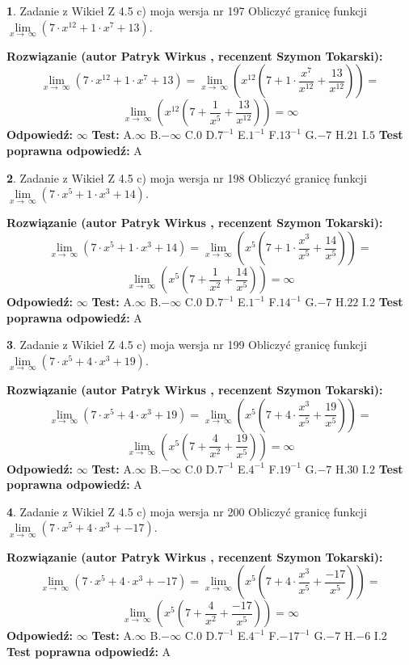 \documentclass[12pt, a4paper]{article}
\theoremstyle{definition} %
\newtheorem{zad}{}
\newcommand{\zadStart}[1]{\begin{zad}#1\newline}
\newcommand{\zadStop}{\end{zad}}
\newcommand{\rozwStart}[2]{\noindent \textbf{Rozwiązanie (autor #1 , recenzent #2): }\newline}
\newcommand{\rozwStop}{\newline}
\newcommand{\odpStart}{\noindent \textbf{Odpowiedź:}\newline}
\newcommand{\odpStop}{\newline}
\newcommand{\testStart}{\noindent \textbf{Test:}\newline}
\newcommand{\testStop}{\newline}
\newcommand{\kluczStart}{\noindent \textbf{Test poprawna odpowiedź:}\newline}
\newcommand{\kluczStop}{\newline}
\begin{document}
\zadStart{Zadanie z Wikieł Z 4.5 c) moja wersja nr 197}
Obliczyć granicę funkcji  $\lim\limits_{x\to\ \infty}(7 \cdot x^{12}+1 \cdot x^{7}+13)$.
\zadStop
\rozwStart{Patryk Wirkus}{Szymon Tokarski}
$$\lim\limits_{x\to\ \infty}(7 \cdot x^{12}+1 \cdot x^{7}+13) = \lim\limits_{x\to\ \infty}(x^{12}(7 +1 \cdot \frac{x^{7}}{x^{12}}+\frac{13}{x^{12}})) =$$ $$\lim\limits_{x\to\ \infty}(x^{12}(7 +\frac{1}{x^{5}}+\frac{13}{x^{12}})) =\infty$$
\rozwStop
\odpStart
$\infty$
\odpStop
\testStart
A.$\infty$ B.$-\infty$ C.$0$ D.$7^{-1}$ E.$1^{-1}$
F.$13^{-1}$ G.$-7$
H.$21$
I.$5$
\testStop
\kluczStart
A
\kluczStop



\zadStart{Zadanie z Wikieł Z 4.5 c) moja wersja nr 198}
Obliczyć granicę funkcji  $\lim\limits_{x\to\ \infty}(7 \cdot x^{5}+1 \cdot x^{3}+14)$.
\zadStop
\rozwStart{Patryk Wirkus}{Szymon Tokarski}
$$\lim\limits_{x\to\ \infty}(7 \cdot x^{5}+1 \cdot x^{3}+14) = \lim\limits_{x\to\ \infty}(x^{5}(7 +1 \cdot \frac{x^{3}}{x^{5}}+\frac{14}{x^{5}})) =$$ $$\lim\limits_{x\to\ \infty}(x^{5}(7 +\frac{1}{x^{2}}+\frac{14}{x^{5}})) =\infty$$
\rozwStop
\odpStart
$\infty$
\odpStop
\testStart
A.$\infty$ B.$-\infty$ C.$0$ D.$7^{-1}$ E.$1^{-1}$
F.$14^{-1}$ G.$-7$
H.$22$
I.$2$
\testStop
\kluczStart
A
\kluczStop



\zadStart{Zadanie z Wikieł Z 4.5 c) moja wersja nr 199}
Obliczyć granicę funkcji  $\lim\limits_{x\to\ \infty}(7 \cdot x^{5}+4 \cdot x^{3}+19)$.
\zadStop
\rozwStart{Patryk Wirkus}{Szymon Tokarski}
$$\lim\limits_{x\to\ \infty}(7 \cdot x^{5}+4 \cdot x^{3}+19) = \lim\limits_{x\to\ \infty}(x^{5}(7 +4 \cdot \frac{x^{3}}{x^{5}}+\frac{19}{x^{5}})) =$$ $$\lim\limits_{x\to\ \infty}(x^{5}(7 +\frac{4}{x^{2}}+\frac{19}{x^{5}})) =\infty$$
\rozwStop
\odpStart
$\infty$
\odpStop
\testStart
A.$\infty$ B.$-\infty$ C.$0$ D.$7^{-1}$ E.$4^{-1}$
F.$19^{-1}$ G.$-7$
H.$30$
I.$2$
\testStop
\kluczStart
A
\kluczStop



\zadStart{Zadanie z Wikieł Z 4.5 c) moja wersja nr 200}
Obliczyć granicę funkcji  $\lim\limits_{x\to\ \infty}(7 \cdot x^{5}+4 \cdot x^{3}+-17)$.
\zadStop
\rozwStart{Patryk Wirkus}{Szymon Tokarski}
$$\lim\limits_{x\to\ \infty}(7 \cdot x^{5}+4 \cdot x^{3}+-17) = \lim\limits_{x\to\ \infty}(x^{5}(7 +4 \cdot \frac{x^{3}}{x^{5}}+\frac{-17}{x^{5}})) =$$ $$\lim\limits_{x\to\ \infty}(x^{5}(7 +\frac{4}{x^{2}}+\frac{-17}{x^{5}})) =\infty$$
\rozwStop
\odpStart
$\infty$
\odpStop
\testStart
A.$\infty$ B.$-\infty$ C.$0$ D.$7^{-1}$ E.$4^{-1}$
F.$-17^{-1}$ G.$-7$
H.$-6$
I.$2$
\testStop
\kluczStart
A
\kluczStop
\end{document}
